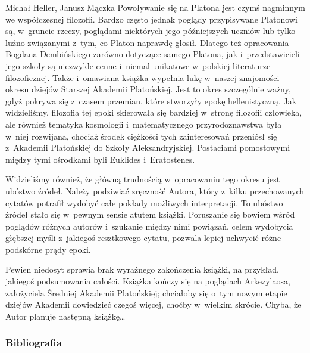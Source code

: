 \begin{recplenv}{Michał Heller, Janusz Mączka}
Powoływanie się na Platona jest czymś nagminnym we współczesnej filozofii. Bardzo
często jednak poglądy przypisywane Platonowi są, w~gruncie rzeczy, poglądami niektórych jego późniejszych uczniów lub
tylko luźno związanymi z~tym, co Platon naprawdę głosił. Dlatego też opracowania Bogdana Dembińskiego zarówno dotyczące
samego Platona, jak i~przedstawicieli jego szkoły są niezwykle cenne i~niemal unikatowe w~polskiej literaturze
filozoficznej. Także i~omawiana książka wypełnia lukę w~naszej znajomości okresu dziejów Starszej Akademii
Platońskiej. Jest to okres szczególnie ważny, gdyż pokrywa się z~czasem przemian, które stworzyły epokę hellenistyczną.
Jak widzieliśmy, filozofia tej epoki skierowała się bardziej w~stronę filozofii człowieka, ale również tematyka
kosmologii i~matematycznego przyrodoznawstwa była w~niej rozwijana, chociaż środek ciężkości tych zainteresowań
przeniósł się z~Akademii Platońskiej do Szkoły Aleksandryjskiej. Postaciami pomostowymi między tymi ośrodkami byli
Euklides i~Eratostenes.


Widzieliśmy również, że główną trudnością w~opracowaniu tego okresu jest ubóstwo
źródeł. Należy podziwiać zręczność Autora, który z~kilku przechowanych cytatów potrafił wydobyć całe pokłady możliwych
interpretacji. To ubóstwo źródeł stało się w~pewnym sensie atutem książki. Poruszanie się bowiem wśród poglądów różnych
autorów i~szukanie między nimi powiązań, celem wydobycia głębszej myśli z~jakiegoś resztkowego cytatu, pozwala lepiej
uchwycić różne podskórne prądy epoki.


Pewien niedosyt sprawia brak wyraźnego zakończenia książki, na przykład, jakiegoś
podsumowania całości. Książka kończy się na poglądach Arkezylaosa, założyciela Średniej Akademii Platońskiej; chciałoby
się o~tym nowym etapie dziejów Akademii dowiedzieć czegoś więcej, choćby w~wielkim skrócie. Chyba, że Autor planuje
następną książkę\ldots

\smallskip
{}




\subsubsection{Bibliografia}\nopagebreak[4]
\end{recplenv}
